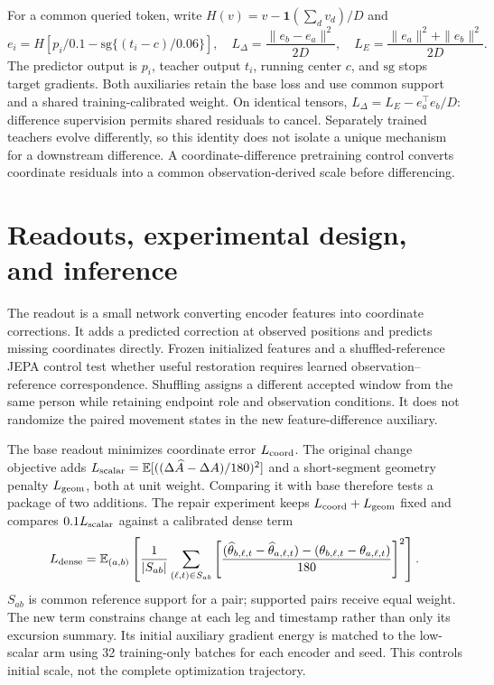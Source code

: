 \documentclass{article}
\begin{document}
For a common queried token, write $H(v)=v-\mathbf1(\sum_d v_d)/D$ and
\begin{equation}
e_i=H\left[p_i/0.1-\mathrm{sg}\{(t_i-c)/0.06\}\right],\quad
L_\Delta=\frac{\|e_b-e_a\|^2}{2D},\quad
L_E=\frac{\|e_a\|^2+\|e_b\|^2}{2D}.
\label{eq:feature}
\end{equation}
The predictor output is $p_i$, teacher output $t_i$, running center $c$, and $\mathrm{sg}$ stops target gradients. Both auxiliaries retain the base loss and use common support and a shared training-calibrated weight. On identical tensors, $L_\Delta=L_E-e_a^\top e_b/D$: difference supervision permits shared residuals to cancel. Separately trained teachers evolve differently, so this identity does not isolate a unique mechanism for a downstream difference. A coordinate-difference pretraining control converts coordinate residuals into a common observation-derived scale before differencing.

\clearpage
\section{Readouts, experimental design, and inference}
The readout is a small network converting encoder features into coordinate corrections. It adds a predicted correction at observed positions and predicts missing coordinates directly. Frozen initialized features and a shuffled-reference JEPA control test whether useful restoration requires learned observation--reference correspondence. Shuffling assigns a different accepted window from the same person while retaining endpoint role and observation conditions. It does not randomize the paired movement states in the new feature-difference auxiliary.

The base readout minimizes coordinate error $L_{\rm coord}$. The original change objective adds $L_{\rm scalar}=\mathbb E[((\Delta\widehat A-\Delta A)/180)^2]$ and a short-segment geometry penalty $L_{\rm geom}$, both at unit weight. Comparing it with base therefore tests a package of two additions. The repair experiment keeps $L_{\rm coord}+L_{\rm geom}$ fixed and compares $0.1L_{\rm scalar}$ against a calibrated dense term
\begin{equation}
L_{\rm dense}=\mathbb E_{(a,b)}\left[\frac{1}{|S_{ab}|}\sum_{(\ell,t)\in S_{ab}}
\left[\frac{(\widehat\theta_{b,\ell,t}-\widehat\theta_{a,\ell,t})-(\theta_{b,\ell,t}-\theta_{a,\ell,t})}{180}\right]^2\right].
\end{equation}
$S_{ab}$ is common reference support for a pair; supported pairs receive equal weight. The new term constrains change at each leg and timestamp rather than only its excursion summary. Its initial auxiliary gradient energy is matched to the low-scalar arm using 32 training-only batches for each encoder and seed. This controls initial scale, not the complete optimization trajectory.
\end{document}
